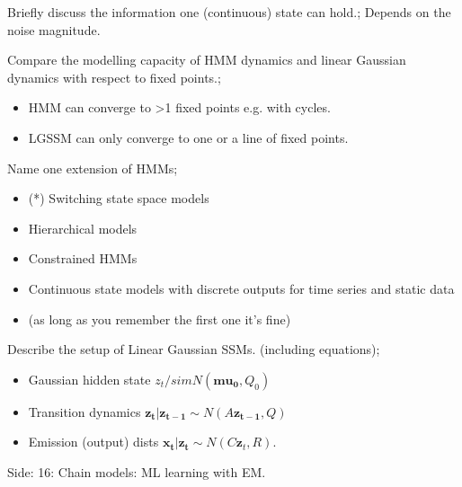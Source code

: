 \documentclass{article}
\begin{document}
Briefly discuss the  information one (continuous) state can hold.; Depends on the noise magnitude. 

Compare the modelling capacity of HMM dynamics and linear Gaussian dynamics with respect to fixed points.; \begin{itemize}
    \item HMM can converge to >1 fixed points e.g. with cycles.
    \item LGSSM can only converge to one or a line of fixed points.
\end{itemize}

Name one extension of HMMs; \begin{itemize}
    \item (*) Switching state space models
    \item Hierarchical models
    \item Constrained HMMs
    \item Continuous state models with discrete outputs for time series and static data
    \item (as long as you remember the first one it's fine)
\end{itemize}

Describe the setup of Linear Gaussian SSMs. (including equations); \begin{itemize}
    \item Gaussian hidden state $z_t /sim N(\mathbf{mu_0}, Q_0)$
    \item Transition dynamics $\mathbf{z_t|z_{t-1}}\sim  N(A\mathbf{z_{t-1}}, Q)$
    \item Emission (output) dists $\mathbf{x_t|z_t}\sim N(C\mathbf{z}_t, R)$. 
\end{itemize}

Side: 16: Chain models: ML learning with EM.
\end{document}
